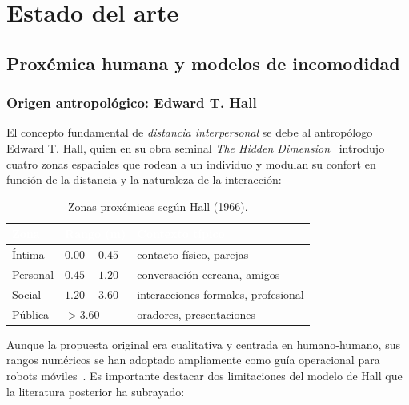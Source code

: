 \documentclass[12pt,a4paper,oneside]{book}
\begin{document}
\chapter{Estado del arte}
\label{chap:estado_arte}




\newpage
\section{Proxémica humana y modelos de incomodidad}
\label{doc7:sec:proxemics}

\subsection{Origen antropológico: Edward T. Hall}

El concepto fundamental de \emph{distancia interpersonal} se debe al antropólogo Edward T. Hall, quien en su obra seminal \emph{The Hidden Dimension}~\cite{Hall1966} introdujo cuatro zonas espaciales que rodean a un individuo y modulan su confort en función de la distancia y la naturaleza de la interacción:

\begin{table}[H]
\centering
\caption{Zonas proxémicas según Hall (1966).}
\renewcommand{\arraystretch}{1.3}
\begin{tabular}{lll}
\toprule
\rowcolor{primary}
\textcolor{white}{\textbf{Zona}} &
\textcolor{white}{\textbf{Rango (m)}} &
\textcolor{white}{\textbf{Contexto típico}} \\
\midrule
Íntima      & $0.00 - 0.45$ & contacto físico, parejas \\
Personal    & $0.45 - 1.20$ & conversación cercana, amigos \\
Social      & $1.20 - 3.60$ & interacciones formales, profesional \\
Pública     & $> 3.60$      & oradores, presentaciones \\
\bottomrule
\end{tabular}
\end{table}

Aunque la propuesta original era cualitativa y centrada en humano-humano, sus rangos numéricos se han adoptado ampliamente como guía operacional para robots móviles~\cite{Mead2017,Pacchierotti2005}. Es importante destacar dos limitaciones del modelo de Hall que la literatura posterior ha subrayado:
\end{document}
